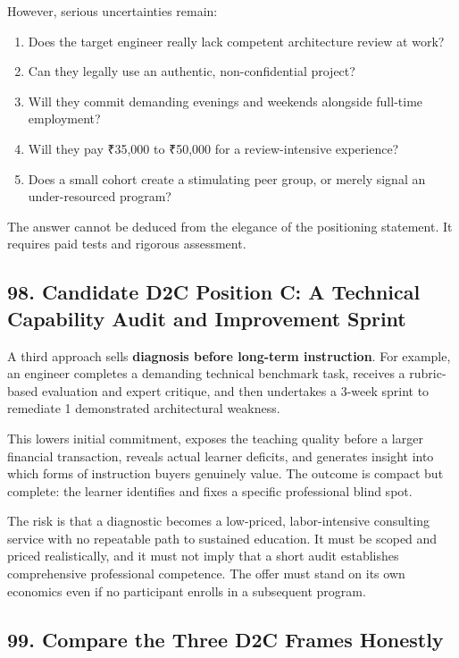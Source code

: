 However, serious uncertainties remain:
\begin{enumerate}
    \item Does the target engineer really lack competent architecture review at work?
    \item Can they legally use an authentic, non-confidential project?
    \item Will they commit demanding evenings and weekends alongside full-time employment?
    \item Will they pay ₹35,000 to ₹50,000 for a review-intensive experience?
    \item Does a small cohort create a stimulating peer group, or merely signal an under-resourced program?
\end{enumerate}

The answer cannot be deduced from the elegance of the positioning statement. It requires paid tests and rigorous assessment.

\subsection*{98. Candidate D2C Position C: A Technical Capability Audit and Improvement Sprint}

A third approach sells \textbf{diagnosis before long-term instruction}. For example, an engineer completes a demanding technical benchmark task, receives a rubric-based evaluation and expert critique, and then undertakes a 3-week sprint to remediate 1 demonstrated architectural weakness.

This lowers initial commitment, exposes the teaching quality before a larger financial transaction, reveals actual learner deficits, and generates insight into which forms of instruction buyers genuinely value. The outcome is compact but complete: the learner identifies and fixes a specific professional blind spot.

The risk is that a diagnostic becomes a low-priced, labor-intensive consulting service with no repeatable path to sustained education. It must be scoped and priced realistically, and it must not imply that a short audit establishes comprehensive professional competence. The offer must stand on its own economics even if no participant enrolls in a subsequent program.

\subsection*{99. Compare the Three D2C Frames Honestly}


